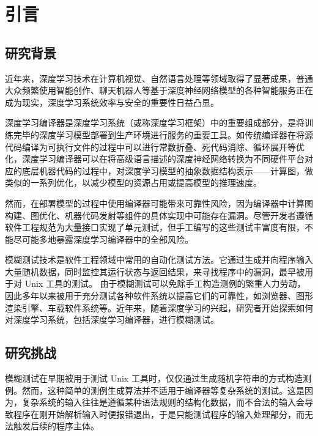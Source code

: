 
\chapter{引言}

\section{研究背景}
近年来，深度学习技术在计算机视觉、自然语言处理等领域取得了显著成果，普通大众频繁使用智能创作、聊天机器人等基于深度神经网络模型的各种智能服务正在成为现实，深度学习系统效率与安全的重要性日益凸显。

深度学习编译器是深度学习系统（或称深度学习框架）中的重要组成部分，是将训练完毕的深度学习模型部署到生产环境进行服务的重要工具。如传统编译器在将源代码编译为可执行文件的过程中可以进行常数折叠、死代码消除、循环展开等优化，深度学习编译器可以在将高级语言描述的深度神经网络转换为不同硬件平台对应的底层机器代码的过程中，对深度学习模型的抽象数据结构表示——计算图，做类似的一系列优化，以减少模型的资源占用或提高模型的推理速度。

然而，在部署模型的过程中使用编译器可能带来可靠性风险，因为编译器中计算图构建、图优化、机器代码发射等组件的具体实现中可能存在漏洞。尽管开发者遵循软件工程规范为大量接口实现了单元测试，但手工编写的这些测试丰富度有限，不能尽可能多地暴露深度学习编译器中的全部风险。

模糊测试技术是软件工程领域中常用的自动化测试方法。它通过生成并向程序输入大量随机数据，同时监控其运行状态与返回结果，来寻找程序中的漏洞，最早被用于对 Unix 工具的测试。
由于模糊测试可以免除手工构造测例的繁重人力劳动，因此多年以来被用于充分测试各种软件系统以提高它们的可靠性，如浏览器、图形渲染引擎、车载软件系统等。近年来，随着深度学习的兴起，研究者开始探索如何对深度学习系统，包括深度学习编译器，进行模糊测试。


\section{研究挑战}
模糊测试在早期被用于测试 Unix 工具时，仅仅通过生成随机字符串的方式构造测例。然而，这种简单的测例生成算法并不适用于编译器等复杂系统的测试。这是因为，复杂系统的输入往往是遵循某种语法规则的结构化数据，而不合法的输入会导致程序在刚开始解析输入时便报错退出，于是只能测试程序的输入处理部分，而无法触发后续的程序主体。

